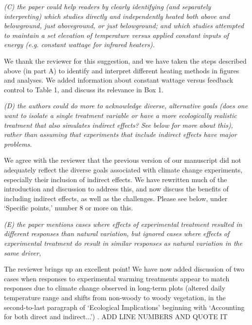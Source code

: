 \documentclass[11pt,a4paper]{letter}
\begin{document}
\begin{letter}{}
\par \emph{(C) the paper could help readers by clearly identifying (and separately interpreting) which studies directly and independently heated both above and belowground, just aboveground, or just belowground; and which studies attempted to maintain a set elevation of temperature versus applied constant inputs of energy (e.g. constant wattage for infrared heaters).}

\par We thank the reviewer for this suggestion, and we have taken the steps described above (in part A) to identify and interpret different heating methods in figures and analyses. We added information about constant wattage versus feedback control to Table 1, and discuss its relevance in Box 1. 

\par \emph{(D) the authors could do more to acknowledge diverse, alternative goals (does one want to isolate a single treatment variable or have a more ecologically realistic treatment that also simulates indirect effects? See below for more about this), rather than assuming that experiments that include indirect effects have major problems.}

\par We agree with the reviewer that the previous version of our manuscript did not adequately reflect the diverse goals associated with climate change experiments, especially their inclusion of indirect effects. We have rewritten much of the introduction and discussion to address this, and now discuss the benefits of including indirect effects, as well as the challenges. Please see below,  under `Specific points,' number 8 or more on this.


\par \emph{(E) the paper mentions cases where effects of experimental treatment resulted in different responses than natural variation, but ignored cases where effects of experimental treatment do result in similar responses as natural variation in the same driver,}

\par The reviewer brings up an excellent point! We have now added discussion of two cases when responses to experimental warming treatments appear to match responses due to climate change observed in long-term plots (altered daily temperature range and shifts from non-woody to woody vegetation, in the second-to-last paragraph of `Ecological Implications' beginning with `Accounting for both direct and indirect...') . ADD LINE NUMBERS AND QUOTE IT


\end{letter}
\end{document}
